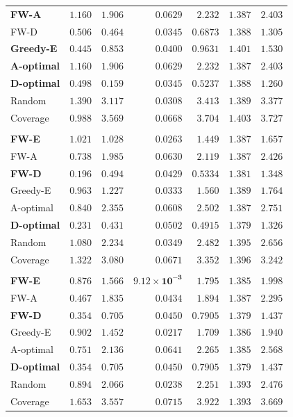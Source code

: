 \documentclass[letterpaper, 9
 pt, conference]{ieeeconf}
\begin{document}
\begin{table}[ht]
\begin{tabular}{lrrrrrr}
\textbf{FW-A} & $1.160$ & $1.906$ & $0.0629$ & $2.232$ & $\mathbf{1.387}$ & $2.403$ \\
FW-D & $0.506$ & $0.464$ & $0.0345$ & $0.6873$ & $1.388$ & $1.305$ \\
\textbf{Greedy-E} & $\mathbf{0.445}$ & $0.853$ & $0.0400$ & $0.9631$ & $1.401$ & $1.530$ \\
\textbf{A-optimal} & $1.160$ & $1.906$ & $0.0629$ & $2.232$ & $\mathbf{1.387}$ & $2.403$ \\
\textbf{D-optimal} & $0.498$ & $\mathbf{0.159}$ & $0.0345$ & $\mathbf{0.5237}$ & $1.388$ & $\mathbf{1.260}$ \\
Random & $1.390$ & $3.117$ & $0.0308$ & $3.413$ & $1.389$ & $3.377$ \\
Coverage & $0.988$ & $3.569$ & $0.0668$ & $3.704$ & $1.403$ & $3.727$ \\
\addlinespace[1pt]
\multicolumn{7}{l}{\textit{$K{=}40$}} \\[1pt]
\textbf{FW-E} & $1.021$ & $1.028$ & $\mathbf{0.0263}$ & $1.449$ & $1.387$ & $1.657$ \\
FW-A & $0.738$ & $1.985$ & $0.0630$ & $2.119$ & $1.387$ & $2.426$ \\
\textbf{FW-D} & $\mathbf{0.196}$ & $0.494$ & $0.0429$ & $0.5334$ & $1.381$ & $1.348$ \\
Greedy-E & $0.963$ & $1.227$ & $0.0333$ & $1.560$ & $1.389$ & $1.764$ \\
A-optimal & $0.840$ & $2.355$ & $0.0608$ & $2.502$ & $1.387$ & $2.751$ \\
\textbf{D-optimal} & $0.231$ & $\mathbf{0.431}$ & $0.0502$ & $\mathbf{0.4915}$ & $\mathbf{1.379}$ & $\mathbf{1.326}$ \\
Random & $1.080$ & $2.234$ & $0.0349$ & $2.482$ & $1.395$ & $2.656$ \\
Coverage & $1.322$ & $3.080$ & $0.0671$ & $3.352$ & $1.396$ & $3.242$ \\
\addlinespace[1pt]
\multicolumn{7}{l}{\textit{$K{=}50$}} \\[1pt]
\textbf{FW-E} & $0.876$ & $1.566$ & $\mathbf{9.12\!\times\!10^{-3}}$ & $1.795$ & $1.385$ & $1.998$ \\
FW-A & $0.467$ & $1.835$ & $0.0434$ & $1.894$ & $1.387$ & $2.295$ \\
\textbf{FW-D} & $0.354$ & $0.705$ & $0.0450$ & $0.7905$ & $\mathbf{1.379}$ & $\mathbf{1.437}$ \\
Greedy-E & $0.902$ & $1.452$ & $0.0217$ & $1.709$ & $1.386$ & $1.940$ \\
A-optimal & $0.751$ & $2.136$ & $0.0641$ & $2.265$ & $1.385$ & $2.568$ \\
\textbf{D-optimal} & $\mathbf{0.354}$ & $\mathbf{0.705}$ & $0.0450$ & $\mathbf{0.7905}$ & $\mathbf{1.379}$ & $\mathbf{1.437}$ \\
Random & $0.894$ & $2.066$ & $0.0238$ & $2.251$ & $1.393$ & $2.476$ \\
Coverage & $1.653$ & $3.557$ & $0.0715$ & $3.922$ & $1.393$ & $3.669$ \\
\bottomrule
\end{tabular}
\end{table}
\end{document}
